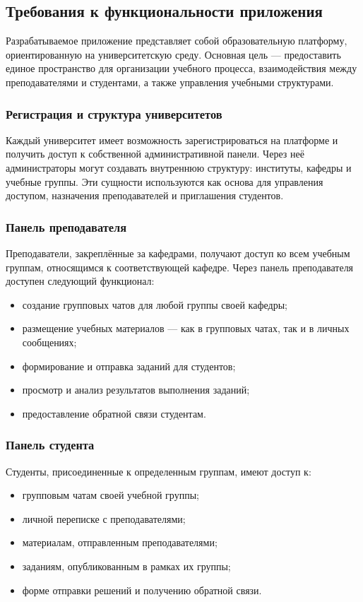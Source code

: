 \subsection*{Требования к функциональности приложения}

Разрабатываемое приложение представляет собой образовательную платформу, ориентированную на университетскую среду. Основная цель — предоставить единое пространство для организации учебного процесса, взаимодействия между преподавателями и студентами, а также управления учебными структурами.

\subsubsection*{Регистрация и структура университетов}
Каждый университет имеет возможность зарегистрироваться на платформе и получить доступ к собственной административной панели. Через неё администраторы могут создавать внутреннюю структуру: институты, кафедры и учебные группы. Эти сущности используются как основа для управления доступом, назначения преподавателей и приглашения студентов.

\subsubsection*{Панель преподавателя}
Преподаватели, закреплённые за кафедрами, получают доступ ко всем учебным группам, относящимся к соответствующей кафедре. Через панель преподавателя доступен следующий функционал:
\begin{itemize}
  \item создание групповых чатов для любой группы своей кафедры;
  \item размещение учебных материалов — как в групповых чатах, так и в личных сообщениях;
  \item формирование и отправка заданий для студентов;
  \item просмотр и анализ результатов выполнения заданий;
  \item предоставление обратной связи студентам.
\end{itemize}

\subsubsection*{Панель студента}
Студенты, присоединенные к определенным группам, имеют доступ к:
\begin{itemize}
  \item групповым чатам своей учебной группы;
  \item личной переписке с преподавателями;
  \item материалам, отправленным преподавателями;
  \item заданиям, опубликованным в рамках их группы;
  \item форме отправки решений и получению обратной связи.
\end{itemize}

